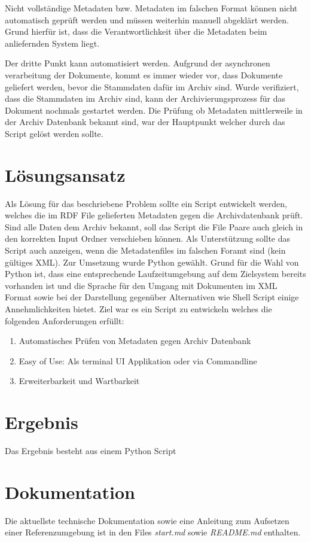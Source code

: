 \documentclass[a4paper,oneside, 12pt]{report}
\begin{document}
Nicht vollständige Metadaten bzw. Metadaten im falschen Format können nicht automatisch geprüft werden und müssen weiterhin manuell abgeklärt werden. Grund hierfür ist, dass die Verantwortlichkeit über die Metadaten beim anliefernden System liegt.

Der dritte Punkt kann automatisiert werden. Aufgrund der asynchronen verarbeitung der Dokumente, kommt es immer wieder vor, dass Dokumente geliefert werden, bevor die Stammdaten dafür im Archiv sind. Wurde verifiziert, dass die Stammdaten im Archiv sind, kann der Archivierungsprozess für das Dokument nochmals gestartet werden. Die Prüfung ob Metadaten mittlerweile in der Archiv Datenbank bekannt sind, war der Hauptpunkt welcher durch das Script gelöst werden sollte.

\section{Lösungsansatz}
Als Lösung für das beschriebene Problem sollte ein Script entwickelt werden, welches die im \ac{RDF} File gelieferten Metadaten gegen die Archivdatenbank prüft. Sind alle Daten dem Archiv bekannt, soll das Script die File Paare auch gleich in den korrekten Input Ordner verschieben können. Als Unterstützung sollte das Script auch anzeigen, wenn die Metadatenfiles im falschen Foramt sind (kein gültiges XML). Zur Umsetzung wurde Python gewählt. Grund für die Wahl von Python ist, dass eine entsprechende Laufzeitumgebung auf dem Zielsystem bereits vorhanden ist und die Sprache für den Umgang mit Dokumenten im XML Format sowie bei der Darstellung gegenüber Alternativen wie Shell Script einige Annehmlichkeiten bietet. Ziel war es ein Script zu entwickeln welches die folgenden Anforderungen erfüllt:

\begin{enumerate}
  \item Automatisches Prüfen von Metadaten gegen Archiv Datenbank
  \item Easy of Use: Als terminal UI Applikation oder via Commandline
  \item Erweiterbarkeit und Wartbarkeit
\end{enumerate}

\section{Ergebnis}
Das Ergebnis besteht aus einem Python Script

\section{Dokumentation}
Die aktuellste technische Dokumentation sowie eine Anleitung zum Aufsetzen einer Referenzumgebung ist in den Files \textit{start.md} sowie \textit{README.md} enthalten.
\end{document}
